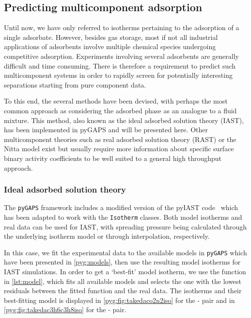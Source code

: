 
\subsection{Predicting multicomponent adsorption}

Until now, we have only referred to isotherms pertaining to the adsorption
of a single adsorbate. However, besides gas storage, most if not all
industrial applications of adsorbents involve multiple chemical 
species undergoing competitive adsorption. Experiments involving
several adsorbents are generally difficult and time consuming.
There is therefore a requirement to predict such multicomponent systems
in order to rapidly screen for potentially interesting separations
starting from pure component data.

To this end, the several methods have been devised, with perhaps
the most common approach as considering the adsorbed phase as 
an analogue to a fluid mixture. This method, also known as the 
ideal adsorbed solution theory (IAST), has been implemented in
pyGAPS and will be presented here. Other multicomponent theories
such as real adsorbed solution theory (RAST) or the Nitta model
exist but usually require more information about specific
surface binary activity coefficients to be well suited to a
general high throughput approach.

\subsubsection{Ideal adsorbed solution theory}

The \texttt{pyGAPS} framework includes a modified version of 
the pyIAST code~\cite{simonPyIASTIdealAdsorbed2016} which has 
been adapted to work with the \texttt{Isotherm} 
classes. Both model isotherms and real data can be used for 
IAST, with spreading pressure being calculated through the 
underlying isotherm model or through interpolation, respectively. 

In this case, we fit the experimental data to the available models 
in \texttt{pyGAPS} which have been presented in \autoref{pyg:models},
then use the resulting model isotherms for IAST simulations. 
In order to get a `best-fit' model isotherm,
we use the function in \autoref{lst:model},
which fits all available models and selects the one with the lowest 
residuals between the fitted function and the real data.
The isotherms and their best-fitting model is displayed in 
\autoref{pyg:fig:takedaco2n2iso} for the - pair and 
in \autoref{pyg:fig:takedac3h6c3h8iso} for the - pair.

